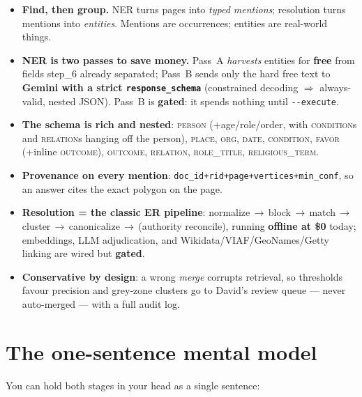 \documentclass[11pt]{article}
\newcommand{\code}[1]{\texttt{#1}}
\newcommand{\type}[1]{\textsc{#1}}
\begin{document}
\begin{tldrbox}[TL;DR]
\begin{itemize}[leftmargin=*]
  \item \textbf{Find, then group.} NER turns pages into \emph{typed mentions};
        resolution turns mentions into \emph{entities}. Mentions are occurrences;
        entities are real-world things.
  \item \textbf{NER is two passes to save money.} Pass~A \emph{harvests} entities
        for \textbf{free} from fields step\_6 already separated; Pass~B sends only
        the hard free text to \textbf{Gemini with a strict \code{response\_schema}}
        (constrained decoding $\Rightarrow$ always-valid, nested JSON). Pass~B is
        \textbf{gated}: it spends nothing until \code{-{}-execute}.
  \item \textbf{The schema is rich and nested}: \type{person} (+age/role/order,
        with \type{condition}s and \type{relation}s hanging off the person),
        \type{place}, \type{org}, \type{date}, \type{condition}, \type{favor}
        (+inline \type{outcome}), \type{outcome}, \type{relation}, \type{role\_title},
        \type{religious\_term}.
  \item \textbf{Provenance on every mention}: \code{doc\_id+rid+page+vertices+min\_conf},
        so an answer cites the exact polygon on the page.
  \item \textbf{Resolution = the classic ER pipeline}: normalize\,$\to$\,block\,$\to$\,match\,$\to$\,cluster\,$\to$\,canonicalize\,$\to$\,(authority reconcile),
        running \textbf{offline at \$0} today; embeddings, LLM adjudication, and
        Wikidata/VIAF/GeoNames/Getty linking are wired but \textbf{gated}.
  \item \textbf{Conservative by design}: a wrong \emph{merge} corrupts retrieval,
        so thresholds favour precision and grey-zone clusters go to David's review
        queue --- never auto-merged --- with a full audit log.
\end{itemize}
\end{tldrbox}

\section{The one-sentence mental model}

You can hold both stages in your head as a single sentence:
\end{document}

